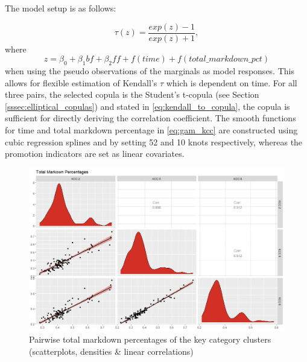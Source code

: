 The model setup is as follows: 

\begin{equation}
\tau(z) = \frac{exp(z) - 1}{exp(z) + 1},
\label{eq:tau_link}
\end{equation}
where
\begin{equation}
z = \beta_0 + \beta_1 \textit{bf} + \beta_2 \textit{ff} + f(\textit{time}) + f(\textit{total\_markdown\_pct})
\label{eq:gam_kcc}
\end{equation}
when using the pseudo observations of the marginals as model responses. This allows for flexible estimation of Kendall's $\tau$ which is dependent on time. For all three pairs, the selected copula is the Student's t-copula (see Section \ref{sssec:elliptical_copulas}) and stated in \autoref{eq:kendall_to_copula}, the copula is sufficient for directly deriving the correlation coefficient. The smooth functions for time and total markdown percentage in \autoref{eq:gam_kcc} are constructed using cubic regression splines and by setting 52 and 10 knots respectively, whereas the promotion indicators are set as linear covariates. \\

\begin{figure}[H]
\centering
  \includegraphics[width=0.9\linewidth]{figures/total_markdown_pct_kcc.png}
  \caption{Pairwise total markdown percentages of the key category clusters (scatterplots, densities \& linear correlations)}
  \label{fig:total_markdown_pct_kcc}
\end{figure}










